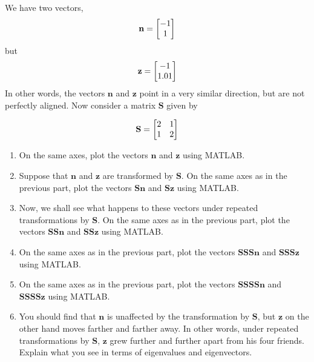\begin{prob}\label{OneDirectionQuestion}  
We have two vectors,
    \begin{align}
        \mathbf{n} = \begin{bmatrix} -1 \\ 1 \end{bmatrix}
    \end{align}
    but
    \begin{align}
        \mathbf{z} = \begin{bmatrix} -1 \\ 1.01 \end{bmatrix}
    \end{align}
    In other words, the vectors  $\mathbf{n}$ and $\mathbf{z}$ point in a very similar direction, but are not perfectly aligned.
    Now consider a  matrix $\mathbf{S}$ given by

    \begin{align}
    \mathbf{S} = \begin{bmatrix} 2 & 1 \\ 1 & 2\end{bmatrix}
    \end{align}

    \begin{enumerate}
    \item On the same axes, plot the vectors $\mathbf{n}$ and $\mathbf{z}$ using MATLAB.
    \item Suppose that $\mathbf{n}$ and $\mathbf{z}$ are transformed by $\mathbf{S}$. On the same axes as in the previous part, plot the vectors $\mathbf{S}\mathbf{n}$ and $\mathbf{S}\mathbf{z}$ using MATLAB.
    \item Now, we shall see what happens to these vectors under repeated transformations by $\mathbf{S}$. On the same axes as in the previous part, plot the vectors $\mathbf{SS}\mathbf{n}$ and $\mathbf{SS}\mathbf{z}$ using MATLAB.
    \item On the same axes as in the previous part, plot the vectors $\mathbf{SSS}\mathbf{n}$ and $\mathbf{SSS}\mathbf{z}$ using MATLAB.
    \item On the same axes as in the previous part, plot the vectors $\mathbf{SSSS}\mathbf{n}$ and $\mathbf{SSSS}\mathbf{z}$ using MATLAB.

    \item You should find that $\mathbf{n}$ is unaffected by the transformation by $\mathbf{S}$, but $\mathbf{z}$ on the other hand moves farther and farther away. In other words, under repeated transformations by $\mathbf{S}$, $\mathbf{z}$ grew further and further apart from his four friends.  Explain what you see in terms of eigenvalues and eigenvectors.
    \end{enumerate}
\end{prob}
